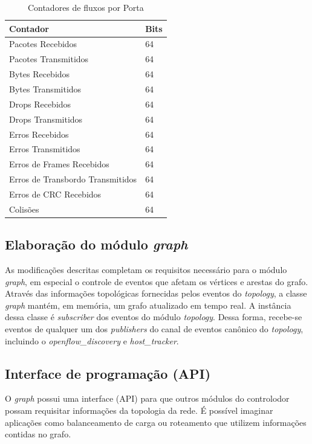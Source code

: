 \begin{table}[h!]
    \centering
    \begin{tabular}{| l | l |}
    \hline
    \textbf{Contador} & \textbf{Bits} \\ \hline
    Pacotes Recebidos & 64 \\ \hline
    Pacotes Transmitidos & 64 \\ \hline
    Bytes Recebidos & 64 \\ \hline
    Bytes Transmitidos & 64 \\ \hline
    Drops Recebidos & 64 \\ \hline
    Drops Transmitidos & 64 \\ \hline
    Erros Recebidos & 64 \\ \hline
    Erros Transmitidos & 64 \\ \hline
    Erros de Frames Recebidos & 64 \\ \hline
    Erros de Transbordo Transmitidos & 64 \\ \hline
    Erros de CRC Recebidos & 64 \\ \hline
    Colisões & 64 \\
    \hline
    \end{tabular}
    \caption{Contadores de fluxos por Porta}
    \label{tbl:counters}
\end{table}

\subsection{Elaboração do módulo \emph{graph}}

As modificações descritas completam os requisitos necessário para o módulo \emph{graph},
em especial o controle de eventos que afetam os vértices e arestas do grafo.
Através das informações topológicas fornecidas pelos eventos do \emph{topology},
a classe \emph{graph} mantém, em memória, um grafo atualizado em tempo real. 
A instância dessa classe é \emph{subscriber} dos eventos do módulo \emph{topology}. 
Dessa forma, recebe-se eventos de qualquer um dos {\it publishers} 
do canal de eventos canônico do \emph{topology}, 
incluindo o \emph{openflow\_discovery} e \emph{host\_tracker}. 

\subsection{Interface de programação (API)}

O \emph{graph} possui uma interface (API) para que outros módulos do 
controlodor possam requisitar informações da topologia da rede. 
É possível imaginar aplicações como balanceamento de carga ou roteamento
que utilizem informações contidas no grafo.

